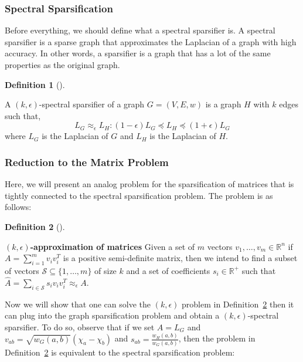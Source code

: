 \documentclass[
  letterpaper,
  DIV=11,
  numbers=noendperiod]{scrartcl}
\theoremstyle{plain}
\theoremstyle{plain}
\theoremstyle{plain}
\theoremstyle{definition}
\newtheorem{definition}{Definition}[section]
\theoremstyle{remark}
\begin{document}
\hypertarget{spectral-sparsification}{%
\subsubsection{Spectral Sparsification}\label{spectral-sparsification}}

Before everything, we should define what a spectral sparsifier is. A
spectral sparsifier is a sparse graph that approximates the Laplacian of
a graph with high accuracy. In other words, a sparsifier is a graph that
has a lot of the same properties as the original graph.

\leavevmode{}%
\begin{definition}[]\label{def-spectral-sparsification}

A \((k, \epsilon)\)-spectral sparsifier of a graph \(G = (V, E, w)\) is
a graph \(H\) with \(k\) edges such that,
\[L_G \approx_\epsilon L_H : (1 - \epsilon) L_G \preceq L_H \preceq (1 + \epsilon) L_G\]
where \(L_G\) is the Laplacian of \(G\) and \(L_H\) is the Laplacian of
\(H\).

\end{definition}

\hypertarget{reduction-to-the-matrix-problem}{%
\subsubsection{Reduction to the Matrix
Problem}\label{reduction-to-the-matrix-problem}}

Here, we will present an analog problem for the sparsification of
matrices that is tightly connected to the spectral sparsification
problem. The problem is as follows:

\leavevmode{}%
\begin{definition}[]\label{def-matrix-approximation}

\textbf{\((k, \epsilon)\)-approximation of matrices} Given a set of
\(m\) vectors \(v_1, \ldots, v_m \in \mathbb{R}^n\) if
\(A = \sum_{i=1}^m v_iv_i^T\) is a positive semi-definite matrix, then
we intend to find a subset of vectors
\(\mathcal{S} \subseteq \{1, \ldots, m\}\) of size \(k\) and a set of
coefficients \(s_i \in \mathbb{R}^+\) such that
\(\hat{A} = \sum_{i \in \mathcal{S}} s_i v_i v_i^T \approx_\epsilon A\).

\end{definition}

Now we will show that one can solve the \((k, \epsilon)\) problem in
Definition~\ref{def-matrix-approximation} then it can plug into the
graph sparsification problem and obtain a \((k, \epsilon)\)-spectral
sparsifier. To do so, observe that if we set \(A = L_G\) and
\(v_{ab} = \sqrt{w_G(a,b)} (\chi_a - \chi_b)\) and
\(s_{ab} = \frac{w_H(a,b)}{w_G(a,b)}\), then the problem in
Definition~\ref{def-matrix-approximation} is equivalent to the spectral
sparsification problem:
\end{document}
